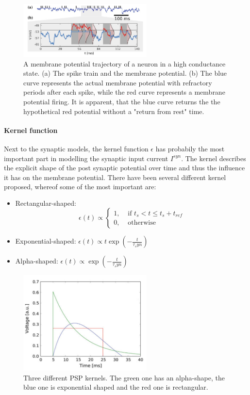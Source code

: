 \begin{figure}
	\centering
    	\includegraphics[width=0.6\textwidth]{imgs/hcs.png} 
    \caption{A membrane potential trajectory of a neuron in a high conductance state. (a) The spike train and the membrane potential. (b) The blue curve represents the actual membrane potential with refractory periods after each spike, while the red curve represents a membrane potential firing. It is apparent, that the blue curve returns the the hypothetical red potential without a "return from rest" time. }
	\label{fig:hcs}
\end{figure}


\paragraph{Kernel function}

Next to the synaptic models, the kernel function $\epsilon$ has probabily the most important part in modelling the synaptic input current $I^{syn}$. 
The kernel describes the explicit shape of the post synaptic potential over time and thus the influence it has on the membrane potential.
There have been several different kernel proposed, whereof some of the most important are:
\begin{itemize}
\item Rectangular-shaped: \[\epsilon(t) \propto  \begin{cases} 1, & \text{ if } t_{s} < t \le t_{s} + t_{ref} \\ 0, & \text{ otherwise } \end{cases} \]
\item Exponential-shaped: $\epsilon(t) \propto t \exp(- \frac{t}{\tau_syn})$
\item Alpha-shaped: $\epsilon(t) \propto \exp(- \frac{t}{\tau_syn})$
\end{itemize}

\begin{figure}
	\centering
    	\includegraphics[width=0.6\textwidth]{imgs/psp_kernel.png} 
    \caption{Three different PSP kernels. The green one has an alpha-shape, the blue one is exponential shaped and the red one is rectangular. }
	\label{fig:pspkernels}
\end{figure}

